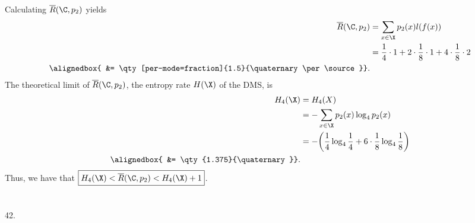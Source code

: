 \documentclass[
  coursecode={MTHE 474},
  assignmentname={Homework \homeworknumber},
  studentnumber=20053722,
  name={Bryan Hoang},
  draft,
]{
  ltxanswer%
}
\begin{document}
\begin{questions}
\begin{parts}
\begin{solution}
\begin{proofpart}
          Calculating \(\overline{R}(\C,p_{2})\) yields
          \begin{align*}
            \overline{R}(\C,p_{2}) &= \sum_{x\in\X} p_{2}(x)l(f(x))                                                   \\
                                   &= \frac{1}{4} \cdot 1 + 2 \cdot \frac{1}{8} \cdot 1 + 4 \cdot \frac{1}{8} \cdot 2 \\
            \alignedbox{           &= \qty[per-mode=fraction]{1.5}{\quaternary\per\source}}.
          \end{align*}
          The theoretical limit of \(\overline{R}(\C,p_{2})\), the entropy rate \(H(\X)\) of the DMS, is
          \begin{align*}
            H_{4}(\X)    &= H_{4}(X)                                                                             \\
                         &= -\sum_{x\in\X} p_{2}(x)\log_{4}p_{2}(x)                                              \\
                         &= -\biggl(\frac{1}{4}\log_{4}\frac{1}{4} + 6\cdot\frac{1}{8}\log_{4}\frac{1}{8}\biggr) \\
            \alignedbox{ &= \qty{1.375}{\quaternary}}.
          \end{align*}
          Thus, we have that \(\boxed{H_{4}(\X)<\overline{R}(\C,p_{2})<H_{4}(\X)+1}\).
        \end{proofpart}
      \end{solution}

      \part{}
      \begin{solution}
        42.
      \end{solution}
    \end{parts}
  \end{questions}
\end{document}
